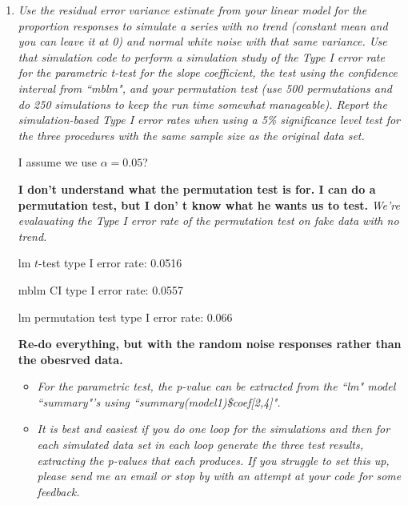 \documentclass[11pt]{article}\usepackage[]{graphicx}\usepackage[]{color}
\begin{document}
\begin{enumerate}
However, I would question the validity of the confidence level set using {\texttt confint()} on an {\texttt mblm()} object. If there was strong evidence of an effect of temperature, at the 95\% confidence level, we would expect to ``reject" 5\% of the time, meaning that approximately 5\% of confidence intervals, in the long run, should contain 0.


\item%
{\it Use the residual error variance estimate from your linear model for the proportion responses to simulate a series with no trend (constant mean and you can leave it at 0) and normal white noise with that same variance. Use that simulation code to perform a simulation study of the Type I error rate for the parametric t-test for the slope coefficient, the test using the confidence interval from ``mblm", and your permutation test (use 500 permutations and do 250 simulations to keep the run time somewhat manageable). Report the simulation-based Type I error rates when using a 5\% significance level test for the three procedures with the same sample size as the original data set.}

I assume we use $\alpha=0.05$?

{\bf I don't understand what the permutation test is for. I can do a permutation test, but I don' t know what he wants us to test.} \emph{We're evalauating the Type I error rate of the permutation test on fake data with no trend.}



lm $t$-test type I error rate: 0.0516

mblm CI type I error rate: 0.0557

lm permutation test type I error rate: 0.066

{\bf Re-do everything, but with the random noise responses rather than the obesrved data.}

\begin{itemize}
\item%
{\it For the parametric test, the p-value can be extracted from the ``lm"  model ``summary"'s using ``summary(model1)\$coef[2,4]".}



\item%
{\it It is best and easiest if you do one loop for the simulations and then for each simulated data set in each loop generate the three test results, extracting the p-values that each produces. If you struggle to set this up, please send me an email or stop by with an attempt at your code for some feedback.}


\end{itemize}
\end{enumerate}
\end{document}
